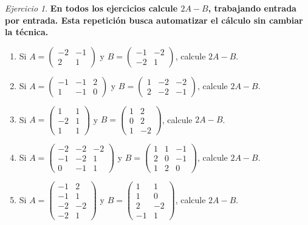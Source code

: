 \documentclass[12pt]{article}
\theoremstyle{remark}
\newtheorem{Ejer}[definicion]{Ejercicio}
\begin{document}
\begin{Ejer}

\textbf{En todos los ejercicios calcule $2A-B$, trabajando entrada por entrada. Esta repetición busca automatizar el cálculo sin cambiar la técnica.}
\begin{enumerate}[resume=banco]

\item Si $A=\begin{pmatrix}-2&-1\\2&1\end{pmatrix}$ y $B=\begin{pmatrix}-1&-2\\-2&1\end{pmatrix}$, calcule $2A-B$.

\item Si $A=\begin{pmatrix}-1&-1&2\\1&-1&0\end{pmatrix}$ y $B=\begin{pmatrix}1&-2&-2\\2&-2&-1\end{pmatrix}$, calcule $2A-B$.

\item Si $A=\begin{pmatrix}1&1\\-2&1\\1&1\end{pmatrix}$ y $B=\begin{pmatrix}1&2\\0&2\\1&-2\end{pmatrix}$, calcule $2A-B$.

\item Si $A=\begin{pmatrix}-2&-2&-2\\-1&-2&1\\0&-1&1\end{pmatrix}$ y $B=\begin{pmatrix}1&1&-1\\2&0&-1\\1&2&0\end{pmatrix}$, calcule $2A-B$.

\item Si $A=\begin{pmatrix}-1&2\\-1&1\\-2&-2\\-2&1\end{pmatrix}$ y $B=\begin{pmatrix}1&1\\1&0\\2&-2\\-1&1\end{pmatrix}$, calcule $2A-B$.


\end{enumerate}
\end{Ejer}
\end{document}
